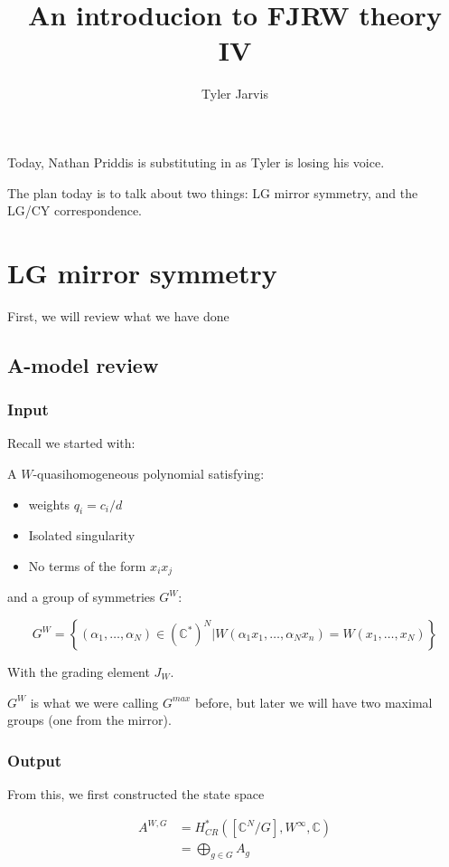 \documentclass{amsart}
\title{An introducion to FJRW theory IV}
\author{Tyler Jarvis}
\theoremstyle{definition}
\newcommand{\C}{\mathbb{C}}
\begin{document}
\maketitle
Today, Nathan Priddis is substituting in as Tyler is losing his voice.

The plan today is to talk about two things: LG mirror symmetry, and the LG/CY correspondence.

\section{LG mirror symmetry}

First, we will review what we have done

\subsection{A-model review}


\subsubsection{Input}
Recall we started with:


A $W$-quasihomogeneous polynomial satisfying:
\begin{itemize}
\item weights $q_i=c_i/d$
\item Isolated singularity 
\item No terms of the form $x_ix_j$
\end{itemize}

and a group of symmetries $G^W$:


 $$G^W=\left\{(\alpha_1,\dots,\alpha_N)\in(\C^*)^N|W(\alpha_1x_1,\dots,\alpha_Nx_n)=W(x_1,\dots, x_N)\right\}$$

With the grading element $J_W$.

$G^W$ is what we were calling $G^{max}$ before, but later we will have two maximal groups (one from the mirror).

\subsubsection{Output}

From this, we first constructed the state space

\begin{align*}
A^{W,G}&=H^*_{CR}([\C^N/G], W^\infty,\C) \\
&=\bigoplus_{g\in G} A_g
\end{align*}
\end{document}
